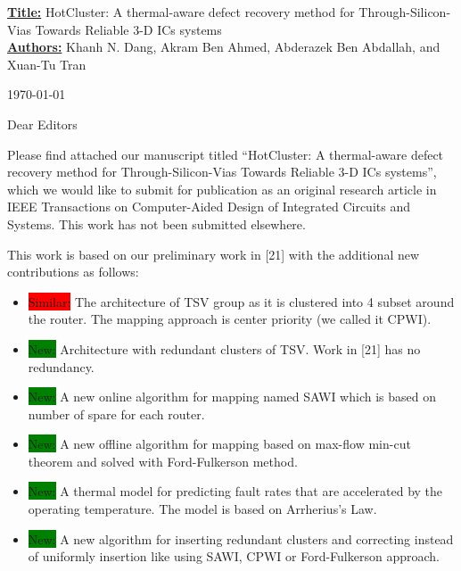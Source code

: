 \documentclass[12pt]{article}
\begin{document}
\begin{sf}
{\small 
\noindent
\textbf{\underline{Title:}} HotCluster: A thermal-aware defect recovery method for Through-Silicon-Vias Towards Reliable 3-D ICs systems\\
\textbf{\underline{Authors:}} Khanh N. Dang, Akram Ben Ahmed, Abderazek Ben Abdallah, and Xuan-Tu Tran \\
\vspace{0.5cm}}
\begin{flushright}
	\today
\end{flushright}

\noindent
Dear Editors 
\vspace{.5cm}

\noindent
Please find attached our manuscript titled ``HotCluster: A thermal-aware defect recovery method for Through-Silicon-Vias Towards Reliable 3-D ICs systems'', which we would like to submit for publication as an original research article in IEEE Transactions on Computer-Aided Design of Integrated Circuits and Systems. This work has not been submitted elsewhere. 

\vspace{.3cm}
\noindent
This work is based on our preliminary work in [21] with the additional new contributions as follows:


\begin{itemize}
	
	\item \colorbox{red}{Similar:} The architecture of TSV group as it is clustered into 4 subset around the router. The mapping approach is center priority (we called it CPWI).
	\item \colorbox{green}{New:} Architecture with redundant clusters of TSV. Work in [21] has no redundancy.
	\item \colorbox{green}{New:} A new online algorithm for  mapping named SAWI which is based on number of spare for each router.
	\item \colorbox{green}{New:} A new offline algorithm for  mapping based on max-flow min-cut theorem and solved with Ford-Fulkerson method.
	\item \colorbox{green}{New:} A thermal model for predicting fault rates that are accelerated by the operating temperature. The model is based on Arrherius's Law.
	\item \colorbox{green}{New:} A new algorithm for inserting redundant clusters and correcting instead of uniformly insertion like using SAWI, CPWI or Ford-Fulkerson approach.


\end{itemize}
\end{sf}
\end{document}
